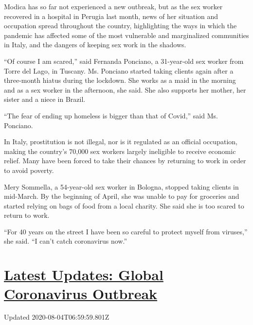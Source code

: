Modica has so far not experienced a new outbreak, but as the sex worker
recovered in a hospital in Perugia last month, news of her situation and
occupation spread throughout the country, highlighting the ways in which
the pandemic has affected some of the most vulnerable and marginalized
communities in Italy, and the dangers of keeping sex work in the
shadows.

``Of course I am scared,'' said Fernanda Ponciano, a 31-year-old sex
worker from Torre del Lago, in Tuscany. Ms. Ponciano started taking
clients again after a three-month hiatus during the lockdown. She works
as a maid in the morning and as a sex worker in the afternoon, she said.
She also supports her mother, her sister and a niece in Brazil.

``The fear of ending up homeless is bigger than that of Covid,'' said
Ms. Ponciano.

In Italy, prostitution is not illegal, nor is it regulated as an
official occupation, making the country's 70,000 sex workers largely
ineligible to receive economic relief. Many have been forced to take
their chances by returning to work in order to avoid poverty.

Mery Sommella, a 54-year-old sex worker in Bologna, stopped taking
clients in mid-March. By the beginning of April, she was unable to pay
for groceries and started relying on bags of food from a local charity.
She said she is too scared to return to work.

``For 40 years on the street I have been so careful to protect myself
from viruses,'' she said. ``I can't catch coronavirus now.''

\hypertarget{latest-updates-global-coronavirus-outbreak}{%
\section{\texorpdfstring{\href{https://www.nytimes.com/2020/08/03/world/coronavirus-covid-19.html?action=click\&pgtype=Article\&state=default\&region=MAIN_CONTENT_1\&context=storylines_live_updates}{Latest
Updates: Global Coronavirus
Outbreak}}{Latest Updates: Global Coronavirus Outbreak}}\label{latest-updates-global-coronavirus-outbreak}}

Updated 2020-08-04T06:59:59.801Z

